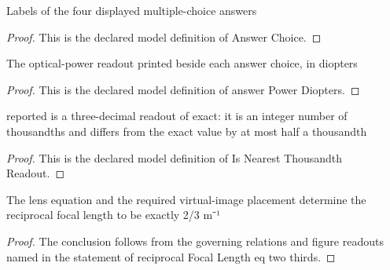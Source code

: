 \begin{definition}
  \label{def:physics:phyx-mini-0029:phyxminiproblems-problemphyxmini0029-answerchoice}
  Labels of the four displayed multiple-choice answers
\end{definition}
\begin{proof}
  This is the declared model definition of Answer Choice.
\end{proof}
\begin{definition}
  \label{def:physics:phyx-mini-0029:phyxminiproblems-problemphyxmini0029-answerpowerdiopters}
  The optical-power readout printed beside each answer choice, in diopters
\end{definition}
\begin{proof}
  This is the declared model definition of answer Power Diopters.
\end{proof}
\begin{definition}
  \label{def:physics:phyx-mini-0029:phyxminiproblems-problemphyxmini0029-isnearestthousandthreadout}
  reported is a three-decimal readout of exact: it is an integer number of thousandths and differs from the exact value by at most half a thousandth
\end{definition}
\begin{proof}
  This is the declared model definition of Is Nearest Thousandth Readout.
\end{proof}
\begin{lemma}
  \label{lem:physics:phyx-mini-0029:phyxminiproblems-problemphyxmini0029-reciprocalfocallength-eq-two-thirds}
  The lens equation and the required virtual-image placement determine the reciprocal focal length to be exactly 2/3 m⁻¹
\end{lemma}
\begin{proof}
  The conclusion follows from the governing relations and figure readouts named in the statement of reciprocal Focal Length eq two thirds.
\end{proof}
